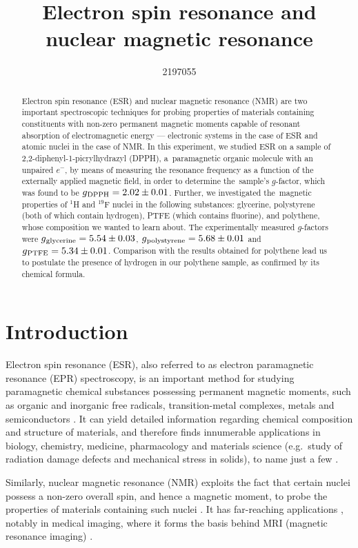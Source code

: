 \documentclass[a4paper]{jpconf}
\numberwithin{equation}{section}
\begin{document}
\title{Electron spin resonance and nuclear magnetic resonance}
\author{2197055}

\begin{abstract}
Electron spin resonance (ESR) and nuclear magnetic resonance (NMR) are two important spectroscopic techniques for probing properties of materials containing constituents with non-zero permanent magnetic moments capable of resonant absorption of electromagnetic energy --- electronic systems in the case of ESR and atomic nuclei in the case of NMR. In this experiment, we studied ESR on a sample of 2,2-diphenyl-1-picrylhydrazyl (DPPH), a~paramagnetic organic molecule with an unpaired $e^-$, by means of measuring the resonance frequency as a function of the externally applied magnetic field, in order to determine the~sample\textquoteright s $g$-factor, which was found to be $g\textsubscript{DPPH} = 2.02 \pm 0.01$.
Further, we investigated the~magnetic properties of ${}^1$H and ${}^{19}$F nuclei in the following substances: glycerine, polystyrene (both of which contain hydrogen), PTFE (which contains fluorine), and polythene, whose composition we wanted to learn about. The experimentally measured $g$-factors were $g\textsubscript{glycerine} = 5.54 \pm 0.03$, $g\textsubscript{polystyrene} = 5.68 \pm 0.01$ and $g\textsubscript{PTFE} = 5.34 \pm 0.01$. Comparison with the results obtained for polythene lead us to postulate the presence of hydrogen in our polythene sample, as confirmed by its chemical formula.
\end{abstract}

\section{Introduction}
Electron spin resonance (ESR), also referred to as electron paramagnetic resonance (EPR) spectroscopy,      
is an important method for studying paramagnetic chemical substances possessing permanent magnetic moments, such as organic and inorganic free radicals, transition-metal complexes, metals and semiconductors \cite{Lancaster}. It can yield detailed information regarding chemical composition and structure of materials, and therefore finds innumerable applications in biology, chemistry, medicine, pharmacology and materials science (e.g.\ study of radiation damage defects and mechanical stress in solids), to name just a few \cite{Lancaster}.

Similarly, nuclear magnetic resonance (NMR) exploits the fact that certain nuclei possess a non-zero overall spin, and hence a magnetic moment, to probe the properties of materials containing such nuclei \cite{Smith}. It has far-reaching applications \cite{Gero}, notably in medical imaging, where it forms the basis behind MRI (magnetic resonance imaging) \cite{Haidekker}.
\end{document}
